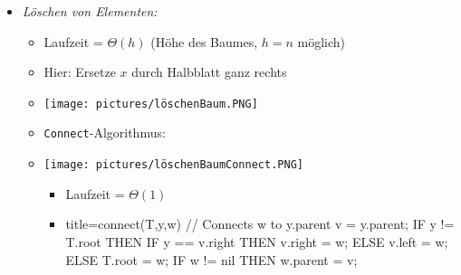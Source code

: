 \documentclass[
    12pt,
    a4paper,
    ngerman,
    color=3b,%
    marginpar=false,
    colorback=false,
    leqno,
]{tudaexercise}
\begin{document}
\begin{itemize}
\begin{itemize}
              \item \textit{Löschen von Elementen:}
                    \begin{itemize}
                        \item Laufzeit = $\Theta(h)$ (Höhe des Baumes, $h=n$ möglich)
                        \item Hier: Ersetze $x$ durch Halbblatt ganz rechts
                        \item[] \texttt{[image: pictures/löschenBaum.PNG]}
                              \pagebreak
                        \item \texttt{Connect}-Algorithmus:
                        \item[]
                              \begin{minipage}[t]{0.35\textwidth}
                                  \texttt{[image: pictures/löschenBaumConnect.PNG]}
                              \end{minipage}
                              \begin{minipage}[t]{0.45\textwidth}
                                  \vspace{-7cm}
                                  \begin{itemize}
                                      \item Laufzeit = $\Theta(1)$
                                      \item[]
                                            \begin{ccode}[autogobble]{title={connect(T,y,w) // Connects w to y.parent}}
                                                v = y.parent;
                                                IF y != T.root THEN
                                                    IF y == v.right THEN
                                                        v.right = w;
                                                    ELSE
                                                        v.left = w;
                                                ELSE
                                                    T.root = w;
                                                IF w != nil THEN
                                                    w.parent = v;
                                            \end{ccode}
                                  \end{itemize}
                              \end{minipage}


\end{itemize}
\end{itemize}
\end{itemize}
\end{document}
